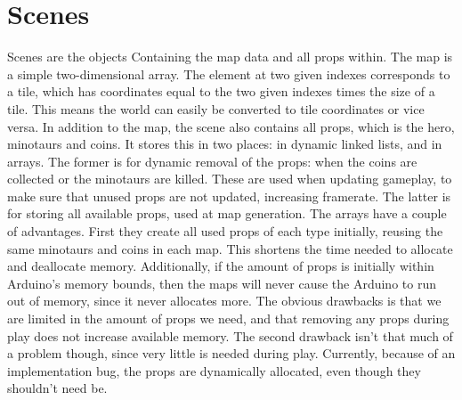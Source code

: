 \section{Scenes} %
Scenes are the objects Containing the map data and all props within. The map is a simple two-dimensional array. The element at two given indexes corresponds to a tile, which has coordinates equal to the two given indexes times the size of a tile. This means the world can easily be converted to tile coordinates or vice versa.
\newline
In addition to the map, the scene also contains all props, which is the hero, minotaurs and coins. It stores this in two places: in dynamic linked lists, and in arrays. The former is for dynamic removal of the props: when the coins are collected or the minotaurs are killed. These are used when updating gameplay, to make sure that unused props are not updated, increasing framerate. The latter is for storing all available props, used at map generation. The arrays have a couple of advantages. First they create all used props of each type initially, reusing the same minotaurs and coins in each map. This shortens the time needed to allocate and deallocate memory. Additionally, if the amount of props is initially within Arduino's memory bounds, then the maps will never cause the Arduino to run out of memory, since it never allocates more. The obvious drawbacks is that we are limited in the amount of props we need, and that removing any props during play does not increase available memory. The second drawback isn't that much of a problem though, since very little is needed during play.
\newline
Currently, because of an implementation bug, the props are dynamically allocated, even though they shouldn't need be.

